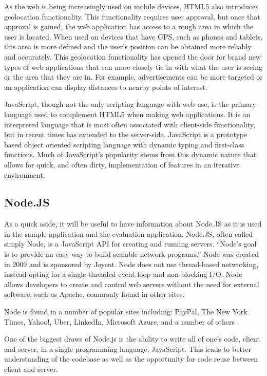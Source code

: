\documentclass[12pt]{ucthesis}
\begin{document}
As the web is being increasingly used on mobile devices, HTML5 also introduces geolocation functionality. This functionality requires user approval, but once that approval is gained, the web application has access to a rough area in which the user is located. When used on devices that have GPS, such as phones and tablets, this area is more defined and the user's position can be obtained more reliably and accurately. This geolocation functionality has opened the door for brand new types of web applications that can more closely tie in with what the user is seeing or the area that they are in. For example, advertisements can be more targeted or an application can display distances to nearby points of interest.

JavaScript, though not the only scripting language with web use, is the primary language used to complement HTML5 when making web applications. It is an interpreted language that is most often associated with client-side functionality, but in recent times has extended to the server-side. JavaScript is a prototype based object oriented scripting language with dynamic typing and first-class functions. Much of JavaScript's popularity stems from this dynamic nature that allows for quick, and often dirty, implementation of features in an iterative environment.

\subsection{Node.JS}
As a quick aside, it will be useful to have information about Node.JS as it is used in the sample application and the evaluation application. Node.JS, often called simply Node, is a JavaScript API for creating and running servers. ``Node's goal is to provide an easy way to build scalable network programs.''\cite{Node} Node was created in 2009 and is sponsored by Joyent. Node does not use thread-based networking, instead opting for a single-threaded event loop and non-blocking I/O. Node allows developers to create and control web servers without the need for external software, such as Apache, commonly found in other sites.

Node is found in a number of popular sites including: PayPal, The New York Times, Yahoo!, Uber, LinkedIn, Microsoft Azure, and a number of others \cite{Node}.

One of the biggest draws of Node.js is the ability to write all of one's code, client and server, in a single programming language, JavaScript. This leads to better understanding of the codebase as well as the opportunity for code reuse between client and server.
\end{document}
